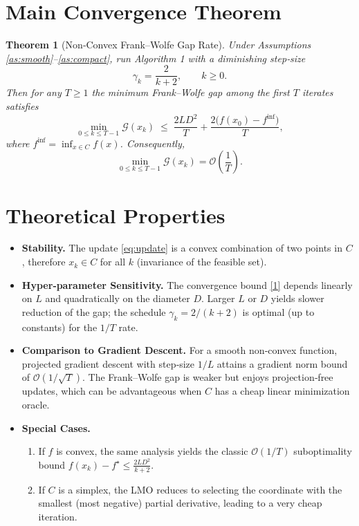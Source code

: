 \documentclass{article}
\newtheorem{theorem}{Theorem}
\begin{document}
\section*{Main Convergence Theorem}
\begin{theorem}[Non‑Convex Frank–Wolfe Gap Rate]\label{thm:fw}
Under Assumptions \ref{as:smooth}–\ref{as:compact}, run Algorithm 1 with a \emph{diminishing} step‑size
\[
\gamma_{k}= \frac{2}{k+2},\qquad k\ge0.
\]
Then for any $T\ge 1$ the minimum Frank–Wolfe gap among the first $T$ iterates satisfies
\[
\min_{0\le k\le T-1}\mathcal{G}(x_{k})
   \;\le\;
   \frac{2L D^{2}}{T}+ \frac{2\bigl(f(x_{0})-f^{\inf}\bigr)}{T},
\tag{1}
\]
where $f^{\inf}=\inf_{x\in C}f(x)$. Consequently,
\[
\min_{0\le k\le T-1}\mathcal{G}(x_{k}) =\mathcal{O}\!\left(\frac{1}{T}\right).
\]
\end{theorem}

\section*{Theoretical Properties}
\begin{itemize}[leftmargin=*]
\item \textbf{Stability.} The update \eqref{eq:update} is a convex combination of two points in $C$, therefore $x_{k}\in C$ for all $k$ (invariance of the feasible set).
\item \textbf{Hyper‑parameter Sensitivity.} The convergence bound \eqref{1} depends linearly on $L$ and quadratically on the diameter $D$. Larger $L$ or $D$ yields slower reduction of the gap; the schedule $\gamma_{k}=2/(k+2)$ is optimal (up to constants) for the $1/T$ rate.
\item \textbf{Comparison to Gradient Descent.} For a smooth non‑convex function, projected gradient descent with step‑size $1/L$ attains a gradient norm bound of $\mathcal{O}(1/\sqrt{T})$. The Frank–Wolfe gap is weaker but enjoys projection‑free updates, which can be advantageous when $C$ has a cheap linear minimization oracle.
\item \textbf{Special Cases.}
\begin{enumerate}
\item If $f$ is convex, the same analysis yields the classic $ \mathcal{O}(1/T)$ suboptimality bound $f(x_{k})-f^{\star}\le \frac{2L D^{2}}{k+2}$.
\item If $C$ is a simplex, the LMO reduces to selecting the coordinate with the smallest (most negative) partial derivative, leading to a very cheap iteration.
\end{enumerate}
\end{itemize}
\end{document}
